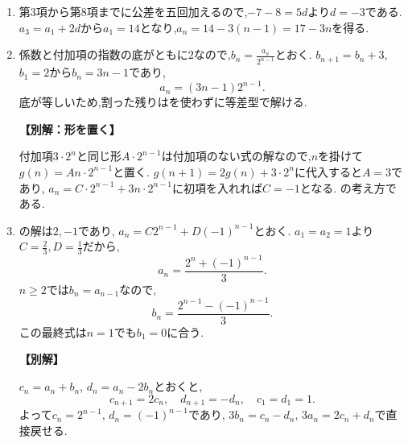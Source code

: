 \begin{enumerate}[label=\textbf{問\arabic*.},leftmargin=3.8em,format=\bookitemlink{practice-basic}{solution}{problem}]
  \item {}\BookMathLayout{}{\\}
    第3項から第8項までに公差を五回加えるので,$-7-8=5d$より$d=-3$である.
    $a_3=a_1+2d$から$a_1=14$となり,$a_n=14-3(n-1)=17-3n$を得る.

  \item {}\BookMathLayout{}{\\}
    係数と付加項の指数の底がともに$2$なので,$b_n=\frac{a_n}{2^{n-1}}$とおく.
    $b_{n+1}=b_n+3$, $b_1=2$から$b_n=3n-1$であり,
    \[
      a_n=(3n-1)2^{n-1}.
    \]
    底が等しいため,割った残りはを使わずに等差型で解ける.
    \par\smallskip\noindent\textbf{【別解：形を置く】}\par
    付加項$3\cdot2^n$と同じ形$A\cdot2^{n-1}$は付加項のない式の解なので,$n$を掛けて$g(n)=An\cdot2^{n-1}$と置く.
    $g(n+1)=2g(n)+3\cdot2^n$に代入すると$A=3$であり,
    $a_n=C\cdot2^{n-1}+3n\cdot2^{n-1}$に初項を入れれば$C=-1$となる.
    の考え方である.

  \item {}\BookMathLayout{}{\\}
    の解は$2,-1$であり,
    $a_n=C2^{n-1}+D(-1)^{n-1}$とおく.
    $a_1=a_2=1$より$C=\frac{2}{3},D=\frac{1}{3}$だから,
    \[
      a_n=\frac{2^n+(-1)^{n-1}}3.
    \]
    $n\ge2$では$b_n=a_{n-1}$なので,
    \[
      b_n=\frac{2^{n-1}-(-1)^{n-1}}3.
    \]
    この最終式は$n=1$でも$b_1=0$に合う.
    \par\smallskip\noindent\textbf{【別解】}\par
    $c_n=a_n+b_n$, $d_n=a_n-2b_n$とおくと,
    \[
      c_{n+1}=2c_n,\quad d_{n+1}=-d_n,
      \quad c_1=d_1=1.
    \]
    よって$c_n=2^{n-1}$, $d_n=(-1)^{n-1}$であり,
    $3b_n=c_n-d_n$, $3a_n=2c_n+d_n$で直接戻せる.


\end{enumerate}
